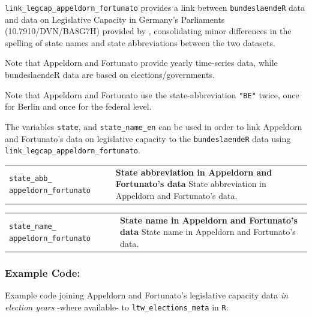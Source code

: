 \documentclass[
]{scrartcl}
\begin{document}
\texttt{link\_legcap\_appeldorn\_fortunato} provides a link between
\texttt{bundeslaendeR} data and data on Legislative Capacity in
Germany's Parliaments (10.7910/DVN/BA8G7H) provided by
\textcite{fortunatoReplicationDataLegislative2021}
\parencite[for more details see][]{appeldornLegislativeCapacityGermany2022},
consolidating minor differences in the spelling of state names and state
abbreviations between the two datasets.

Note that Appeldorn and Fortunato provide yearly time-series data, while
bundeslaendeR data are based on elections/governments.

Note that Appeldorn and Fortunato use the state-abbreviation
\texttt{"BE"} twice, once for Berlin and once for the federal level.

The variables \texttt{state}, and \texttt{state\_name\_en} can be used
in order to link Appeldorn and Fortunato's data on legislative capacity
to the \texttt{bundeslaendeR} data using
\texttt{link\_legcap\_appeldorn\_fortunato}.

\begin{longtable}{p{3.2cm}| p{11cm}}
\texttt{state\_abb\_
appeldorn\_fortunato} &\textbf{State abbreviation in Appeldorn and Fortunato's data}\newline 
State abbreviation in Appeldorn and Fortunato's data.
\end{longtable}

\begin{longtable}{p{3.2cm}| p{11cm}}
\texttt{state\_name\_
appeldorn\_fortunato} &\textbf{State name in Appeldorn and Fortunato's data}\newline 
State name in Appeldorn and Fortunato's data.
\end{longtable}

\hypertarget{example-code}{%
\subsubsection{Example Code:}\label{example-code}}

Example code joining Appeldorn and Fortunato's legislative capacity data
\emph{in election years} -where available- to
\texttt{ltw\_elections\_meta} in \texttt{R}:
\end{document}

